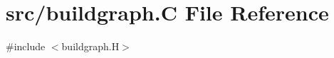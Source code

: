 \hypertarget{buildgraph_8_c}{}\section{src/buildgraph.C File Reference}
\label{buildgraph_8_c}
{\ttfamily \#include $<$buildgraph.\+H$>$}\newline
